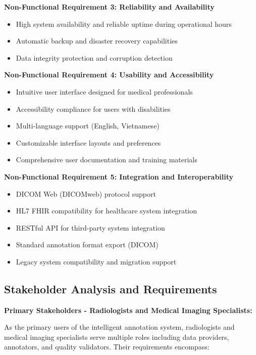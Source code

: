 \textbf{Non-Functional Requirement 3: Reliability and Availability}
\begin{itemize}
    \item High system availability and reliable uptime during operational hours
    \item Automatic backup and disaster recovery capabilities
    \item Data integrity protection and corruption detection
\end{itemize}

\textbf{Non-Functional Requirement 4: Usability and Accessibility}
\begin{itemize}
    \item Intuitive user interface designed for medical professionals
    \item Accessibility compliance for users with disabilities
    \item Multi-language support (English, Vietnamese)
    \item Customizable interface layouts and preferences
    \item Comprehensive user documentation and training materials
\end{itemize}

\textbf{Non-Functional Requirement 5: Integration and Interoperability}
\begin{itemize}
    \item DICOM Web (DICOMweb) protocol support
    \item HL7 FHIR compatibility for healthcare system integration
    \item RESTful API for third-party system integration
    \item Standard annotation format export (DICOM)
    \item Legacy system compatibility and migration support
\end{itemize}

\subsection{Stakeholder Analysis and Requirements}

\textbf{Primary Stakeholders - Radiologists and Medical Imaging Specialists:}

As the primary users of the intelligent annotation system, radiologists and medical imaging specialists serve multiple roles including data providers, annotators, and quality validators. Their requirements encompass:

